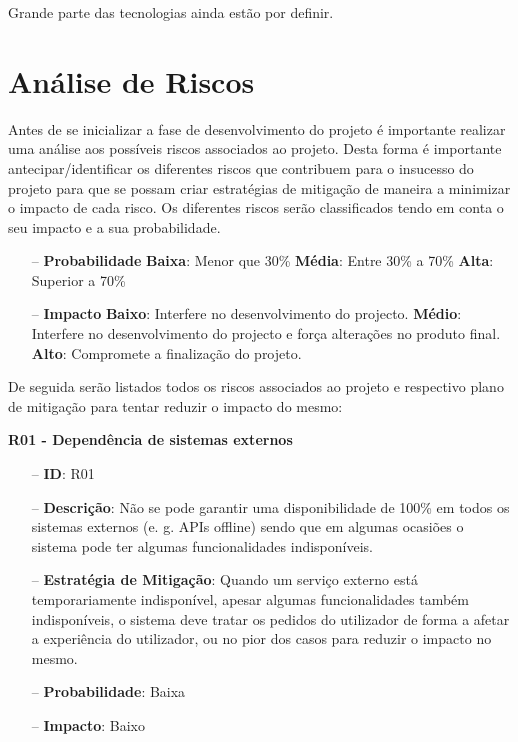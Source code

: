 Grande parte das tecnologias ainda estão por definir. 

\section{Análise de Riscos}
\label{analiseriscos}

Antes de se inicializar a fase de desenvolvimento do projeto é importante realizar uma análise aos possíveis riscos associados ao projeto. Desta forma é importante antecipar/identificar os diferentes riscos que contribuem para o insucesso do projeto para que se possam criar estratégias de mitigação de maneira a minimizar o impacto de cada risco. Os diferentes riscos serão classificados tendo em conta o seu impacto e a sua probabilidade.

\begin{itemize}
	\item[--] \textbf{Probabilidade}
		\subitem \textbf{Baixa}: Menor que 30\%
		\subitem \textbf{Média}: Entre 30\% a 70\%
		\subitem \textbf{Alta}: Superior a 70\%
	\item[--] \textbf{Impacto}
		\subitem \textbf{Baixo}: Interfere no desenvolvimento do projecto.
		\subitem \textbf{Médio}: Interfere no desenvolvimento do projecto e força alterações no produto final.
		\subitem \textbf{Alto}: Compromete a finalização do projeto.
\end{itemize}

De seguida serão listados todos os riscos associados ao projeto e respectivo plano de mitigação para tentar reduzir o impacto do mesmo:

\textbf{R01 - Dependência de sistemas externos}
\begin{itemize}
	\item[--] \textbf{ID}: R01
	\item[--] \textbf{Descrição}: Não se pode garantir uma disponibilidade de 100\% em todos os sistemas externos (e. g. APIs offline) sendo que em algumas ocasiões o sistema pode ter algumas funcionalidades indisponíveis.
	\item[--] \textbf{Estratégia de Mitigação}: Quando um serviço externo está temporariamente indisponível, apesar algumas funcionalidades também indisponíveis, o sistema deve tratar os pedidos do utilizador de forma a afetar a experiência do utilizador, ou no pior dos casos para reduzir o impacto no mesmo.
	\item[--] \textbf{Probabilidade}: Baixa
	\item[--] \textbf{Impacto}: Baixo
\end{itemize}

